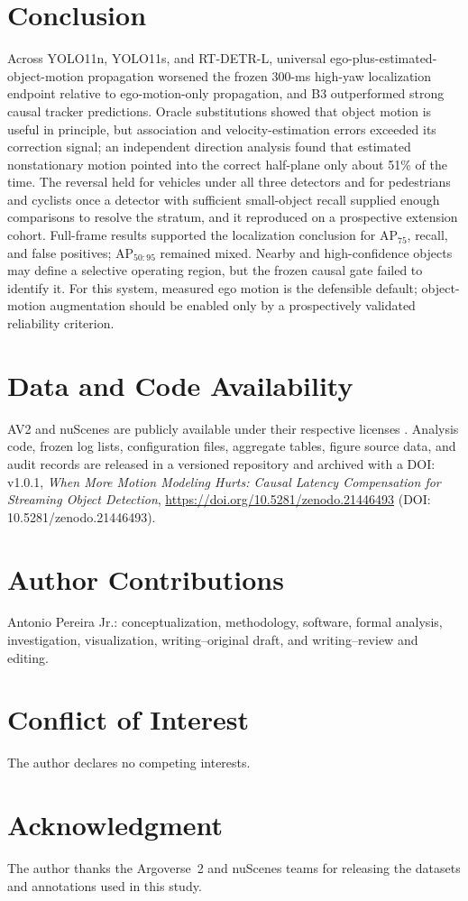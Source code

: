 \documentclass[journal]{IEEEtran}
\begin{document}
\section{Conclusion}
Across YOLO11n, YOLO11s, and RT-DETR-L, universal ego-plus-estimated-object-motion propagation worsened the frozen 300-ms high-yaw localization endpoint relative to ego-motion-only propagation, and B3 outperformed strong causal tracker predictions. Oracle substitutions showed that object motion is useful in principle, but association and velocity-estimation errors exceeded its correction signal; an independent direction analysis found that estimated nonstationary motion pointed into the correct half-plane only about 51\% of the time. The reversal held for vehicles under all three detectors and for pedestrians and cyclists once a detector with sufficient small-object recall supplied enough comparisons to resolve the stratum, and it reproduced on a prospective extension cohort. Full-frame results supported the localization conclusion for AP$_{75}$, recall, and false positives; AP$_{50:95}$ remained mixed. Nearby and high-confidence objects may define a selective operating region, but the frozen causal gate failed to identify it. For this system, measured ego motion is the defensible default; object-motion augmentation should be enabled only by a prospectively validated reliability criterion.

\section*{Data and Code Availability}
AV2 and nuScenes are publicly available under their respective licenses \cite{Wilson2021AV2,Caesar2020nuScenes}. Analysis code, frozen log lists, configuration files, aggregate tables, figure source data, and audit records are released in a versioned repository and archived with a DOI: v1.0.1, \textit{When More Motion Modeling Hurts: Causal Latency Compensation for Streaming Object Detection}, \url{https://doi.org/10.5281/zenodo.21446493} (DOI: 10.5281/zenodo.21446493).

\section*{Author Contributions}
Antonio Pereira Jr.: conceptualization, methodology, software, formal analysis, investigation, visualization, writing--original draft, and writing--review and editing.

\section*{Conflict of Interest}
The author declares no competing interests.

\section*{Acknowledgment}
The author thanks the Argoverse~2 and nuScenes teams for releasing the datasets and annotations used in this study.



\end{document}
